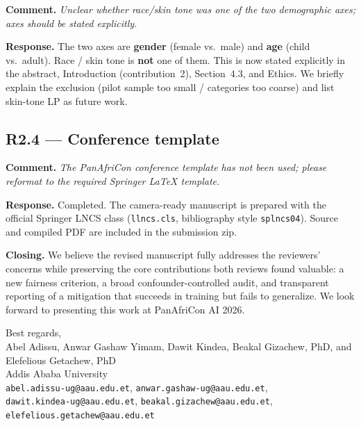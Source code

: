 \documentclass[11pt]{article}
\begin{document}
\textbf{Comment.}
\textit{Unclear whether race/skin tone was one of the two demographic axes;
axes should be stated explicitly.}

\textbf{Response.}
The two axes are \textbf{gender} (female vs.\ male) and \textbf{age} (child
vs.\ adult). Race / skin tone is \textbf{not} one of them. This is now stated
explicitly in the abstract, Introduction (contribution~2), Section~4.3, and
Ethics. We briefly explain the exclusion (pilot sample too small / categories
too coarse) and list skin-tone LP as future work.

\subsection*{R2.4 --- Conference template}

\textbf{Comment.}
\textit{The PanAfriCon conference template has not been used; please reformat
to the required Springer LaTeX template.}

\textbf{Response.}
Completed. The camera-ready manuscript is prepared with the official Springer
LNCS class (\texttt{llncs.cls}, bibliography style \texttt{splncs04}). Source
and compiled PDF are included in the submission zip.

\vspace{0.35em}
\noindent\textbf{Closing.}
We believe the revised manuscript fully addresses the reviewers' concerns while
preserving the core contributions both reviews found valuable: a new fairness
criterion, a broad confounder-controlled audit, and transparent reporting of a
mitigation that succeeds in training but fails to generalize. We look forward
to presenting this work at PanAfriCon AI 2026.

\vspace{0.45em}
\noindent Best regards,\\[0.25em]
Abel Adissu, Anwar Gashaw Yimam, Dawit Kindea,
Beakal Gizachew, PhD, and Elefelious Getachew, PhD\\
Addis Ababa University\\
\texttt{abel.adissu-ug@aau.edu.et},
\texttt{anwar.gashaw-ug@aau.edu.et},\\
\texttt{dawit.kindea-ug@aau.edu.et},
\texttt{beakal.gizachew@aau.edu.et},\\
\texttt{elefelious.getachew@aau.edu.et}
\end{document}
